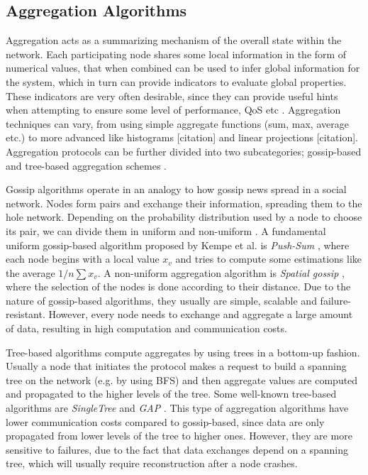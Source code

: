\documentclass[MSc]{icldt}
\begin{document}
\subsection{Aggregation Algorithms}

Aggregation acts as a summarizing mechanism of the overall state within the network. Each participating node shares some local information in the form of numerical values, that when combined can be used to infer global information for the system, which in turn can provide indicators to evaluate global properties. These indicators are very often desirable, since they can provide useful hints when attempting to ensure some level of performance, QoS etc \cite{Makhloufi:2009:DAP:1692742.1692756}. Aggregation techniques can vary, from using simple aggregate functions (sum, max, average etc.) to more advanced like histograms [citation] and linear projections [citation]. Aggregation protocols can be further divided into two subcategories; gossip-based and tree-based aggregation schemes \cite{Makhloufi:2009:DAP:1692742.1692756}.

Gossip algorithms operate in an analogy to how gossip news spread in a social network. Nodes form pairs and exchange their information, spreading them to the hole network. Depending on the probability distribution used by a node to choose its pair, we can divide them in uniform \cite{Kempe:2003:GCA:946243.946317} and non-uniform \cite{Kempe:2004:SGR:1039488.1039491} \cite{Rabbat:2007:SGA:1524876.1525177}. A fundamental uniform gossip-based algorithm proposed by Kempe et al. is \textit{Push-Sum} \cite{Kempe:2004:SGR:1039488.1039491}, where each node begins with a local value $x_v$ and tries to compute some estimations like the average $1/n \sum{x_v}$. A non-uniform aggregation algorithm is \textit{Spatial gossip} \cite{Kempe:2004:SGR:1039488.1039491} \cite{Rabbat:2007:SGA:1524876.1525177}, where the selection of the nodes is done according to their distance. Due to the nature of gossip-based algorithms, they usually are simple, scalable and failure-resistant. However, every node needs to exchange and aggregate a large amount of data, resulting in high computation and communication costs.

Tree-based algorithms compute aggregates by using trees in a bottom-up fashion. Usually a node that initiates the protocol makes a request to build a spanning tree on the network (e.g. by using BFS) and then aggregate values are computed and propagated to the higher levels of the tree. Some well-known tree-based algorithms are \textit{SingleTree} \cite{Bawa03estimatingaggregates} and \textit{GAP} \cite{Dam05ageneric}. This type of aggregation algorithms have lower communication costs compared to gossip-based, since data are only propagated from lower levels of the tree to higher ones. However, they are more sensitive to failures, due to the fact that data exchanges depend on a spanning tree, which will usually require reconstruction after a node crashes.
\end{document}
